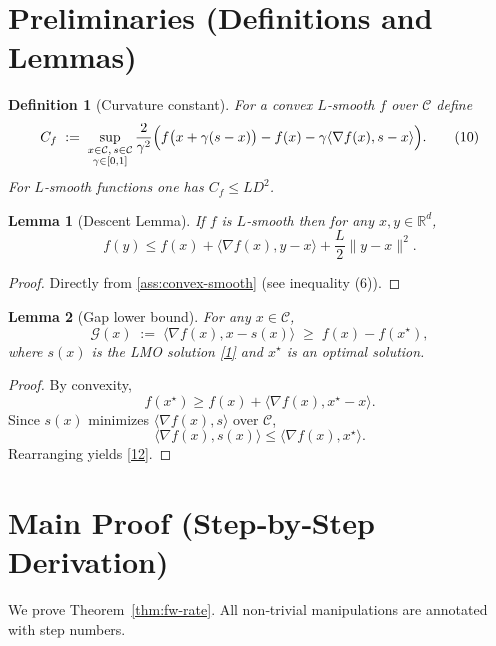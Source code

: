 \documentclass{article}
\newtheorem{lemma}{Lemma}
\newtheorem{definition}{Definition}
\newcommand{\gap}{\mathcal{G}}
\begin{document}
\newpage
\section*{Preliminaries (Definitions and Lemmas)}
\begin{definition}[Curvature constant]\label{def:curvature}
For a convex $L$‑smooth $f$ over $\mathcal{C}$ define
\[
C_f \;:=\; \sup_{\substack{x\in\mathcal{C},\, s\in\mathcal{C}\\ \gamma\in[0,1]}}
\frac{2}{\gamma^{2}}\Bigl(f\bigl(x+\gamma(s-x)\bigr)-f(x)-\gamma\langle\nabla f(x),s-x\rangle\Bigr).
\tag{10}
\]
For $L$‑smooth functions one has $C_f\le L D^{2}$.
\end{definition}
\begin{lemma}[Descent Lemma]\label{lem:descent}
If $f$ is $L$‑smooth then for any $x,y\in\mathbb{R}^{d}$,
\[
f(y)\le f(x)+\langle\nabla f(x),y-x\rangle+\frac{L}{2}\|y-x\|^{2}.
\tag{11}
\]
\end{lemma}
\begin{proof}
Directly from \eqref{ass:convex-smooth} (see inequality (6)). \qedhere
\end{proof}
\begin{lemma}[Gap lower bound]\label{lem:gap-lower}
For any $x\in\mathcal{C}$,
\[
\gap(x)\;:=\;\langle\nabla f(x),x-s(x)\rangle\;\ge\; f(x)-f(x^\star),
\tag{12}
\]
where $s(x)$ is the LMO solution \eqref{1} and $x^\star$ is an optimal solution.
\end{lemma}
\begin{proof}
By convexity,
\[
f(x^\star)\ge f(x)+\langle\nabla f(x),x^\star-x\rangle .
\]
Since $s(x)$ minimizes $\langle\nabla f(x),s\rangle$ over $\mathcal{C}$,
\[
\langle\nabla f(x),s(x)\rangle\le \langle\nabla f(x),x^\star\rangle .
\]
Rearranging yields \eqref{12}. \qedhere
\end{proof}

\section*{Main Proof (Step‑by‑Step Derivation)}
We prove Theorem~\ref{thm:fw-rate}.  
All non‑trivial manipulations are annotated with step numbers.
\end{document}
